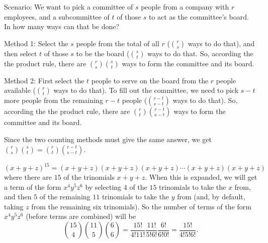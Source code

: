 \begin{Solution}{30.5}
Scenario: We want to pick a committee of $s$ people from a company with $r$ employees, and a subcommittee of  $t$ of those $s$ to act as the committee's board. In how many ways can that be done?

Method 1: Select the $s$ people from the total of all $r$ ($\binom{r}{s}$ ways to do that), and then select $t$ of those $s$ to be the board ($\binom{s}{t}$
ways to do that. So, according the the product rule, there are $\binom{r}{s}\binom{s}{t}$ ways to form the committee and its board.

Method 2: First select the $t$ people to serve on the board from the $r$ people available ($\binom{r}{t}$ ways to do that). To fill out the committee, we need to pick $s-t$ more people from the remaining $r-t$ people ($\binom{r-t}{s-t}$ ways to do that). So, according the the product rule, there are $\binom{r}{t}\binom{r-t}{s-t}$ ways to form the committee and its board.

Since the two counting methods must give the same answer, we get $\binom{r}{s}\binom{s}{t}=\binom{r}{t}\binom{r-t}{s-t}$.


\end{Solution}

\begin{Solution}{30.4}

\end{Solution}

\begin{Solution}{30.5}

\end{Solution}

\begin{Solution}{30.6}

$(x+y+z)^{15} = (x+y+z)(x+y+z)(x+y+z)\cdots(x+y+z)(x+y+z)$ where there are $15$ of the trinomials $x+y+z$.
When this is expanded, we will get a term of the form $x^{4}y^{5}z^{6}$ by selecting $4$ of the $15$ trinomials to take the $x$ from, and then $5$ of the remaining $11$ trinomials to take the $y$ from (and, by default, taking $z$ from the remaining six trinomials). So the number of terms of the form $x^{4}y^{5}z^{6}$ (before terms are combined) will be
\[
\binom{15}{4}\binom{11}{5}\binom{6}{6} = \frac{15!}{4!11!}\frac{11!}{5!6!}\frac{6!}{6!0!} = \frac{15!}{4!5!6!}.
\]


\end{Solution}

